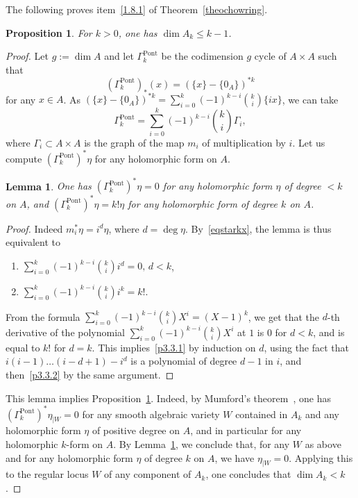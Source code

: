 \documentclass[11pt]{article}
\newtheorem{lemm}[theo]{Lemma}
\newtheorem{prop}[theo]{Proposition}
\theoremstyle{definition}
\numberwithin{equation}{section}
\numberwithin{figure}{section}
\numberwithin{table}{section}
\newcommand{\Pont}{\mathrm{Pont}}
\begin{document}
The following proves item~\eqref{1.8.1} of Theorem~\ref{theochowring}.

\begin{prop}\label{proestimatechowring}
For $k>0$, one has $\dim  A_k\leq k-1$.
\end{prop}

\begin{proof}
Let $g:=\dim A$ and let $\Gamma^{\Pont}_k$ be the codimension $g$ cycle of
$A\times A$ such that
\[
(\Gamma^{\Pont}_{k })_*(x)=(\{x\}-\{0_A\})^{*k}
\]
for any $x\in A$. As $(\{x\}-\{0_A\})^{*k}=\sum_{i=0}^k(-1)^{k-i}\binom{k}{i}\{ix\}$, we can take
\begin{equation}\label{eqstarkx}
\Gamma^{\Pont}_k=\sum_{i=0}^k(-1)^{k-i}\binom{k}{i}\Gamma_{i},
\end{equation}
where $\Gamma_i\subset A\times A$ is the graph of the map $m_i$ of multiplication by $i$. Let us compute $(\Gamma_k^{\Pont})^*\eta$ for any holomorphic form on $A$.

\begin{lemm}\label{lekform}
One has $(\Gamma^{\Pont}_k)^*\eta=0$ for any holomorphic form $\eta$ of degree $<k$ on $A$, and $(\Gamma_k^{\Pont})^*\eta=k!\eta$ for any holomorphic form of degree $k$ on $A$.
\end{lemm}

\begin{proof}
Indeed $m_i^*\eta=i^d\eta$, where $d=\deg \eta$.
By~\eqref{eqstarkx}, the lemma is thus equivalent to
\begin{enumerate}
\item \label{p3.3.1} $\sum_{i=0}^k(-1)^{k-i}\binom{k}{i} i^d=0,\,d<k$,
\item \label{p3.3.2} $\sum_{i=0}^k(-1)^{k-i}\binom{k}{i} i^k=k!$.
\end{enumerate}

From the formula $\sum_{i=0}^k(-1)^{k-i}\binom{k}{i}X^i=(X-1)^k$, we get that the $d$-th derivative of the polynomial $\sum_{i=0}^k(-1)^{k-i}\binom{k}{i}X^i$ at $1$ is $0$ for $d<k$, and is equal to $k!$ for $d=k$. This implies~\eqref{p3.3.1} by induction on $d$, using the fact that $i(i-1)\dots(i-d+1)-i^d$ is a polynomial of degree $d-1$ in $i$, and then~\eqref{p3.3.2} by the same argument.
\end{proof}

This lemma implies Proposition~\ref{proestimatechowring}. Indeed, by Mumford's theorem~\cite{mumford}, one has $(\Gamma^{\Pont}_k)^*\eta_{\mid W}=0$ for any smooth algebraic variety $W$ contained in $A_k$ and any holomorphic form $\eta$ of positive degree on $A$, and in particular for any holomorphic $k$-form on $A$. By Lemma~\ref{lekform}, we conclude that, for any $W$ as above and for any holomorphic form $\eta$ of degree $k$ on $A$, we have $\eta_{\mid W}=0$. Applying this to the regular locus $W$ of any component of $A_k$, one concludes that $\dim A_k<k$.
\end{proof}
\end{document}
